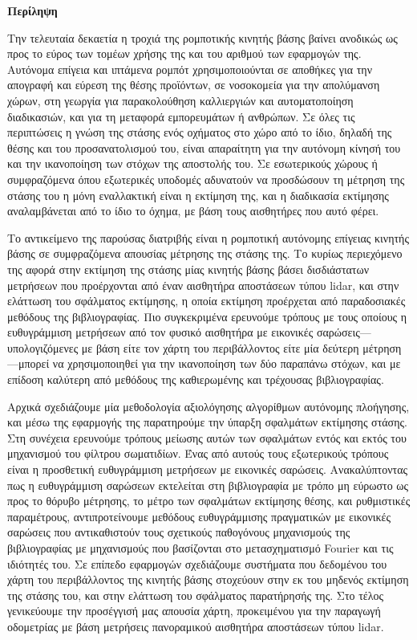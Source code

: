 \singlespace

\vfill
\begin{center}
\textbf{Περίληψη}
\end{center}
\noindent

Την τελευταία δεκαετία η τροχιά της ρομποτικής κινητής βάσης βαίνει ανοδικώς ως
προς το εύρος των τομέων χρήσης της και του αριθμού των εφαρμογών της. Αυτόνομα
επίγεια και ιπτάμενα ρομπότ χρησιμοποιούνται σε αποθήκες για την απογραφή και
εύρεση της θέσης προϊόντων, σε νοσοκομεία για την απολύμανση χώρων, στη γεωργία
για παρακολούθηση καλλιεργιών και αυτοματοποίηση διαδικασιών, και για τη
μεταφορά εμπορευμάτων ή ανθρώπων. Σε όλες τις περιπτώσεις η γνώση της στάσης
ενός οχήματος στο χώρο από το ίδιο, δηλαδή της θέσης και του προσανατολισμού
του, είναι απαραίτητη για την αυτόνομη κίνησή του και την ικανοποίηση των
στόχων της αποστολής του. Σε εσωτερικούς χώρους ή συμφραζόμενα όπου εξωτερικές
υποδομές αδυνατούν να προσδώσουν τη μέτρηση της στάσης του η μόνη εναλλακτική
είναι η εκτίμηση της, και η διαδικασία εκτίμησης αναλαμβάνεται από το ίδιο το
όχημα, με βάση τους αισθητήρες που αυτό φέρει.

Το αντικείμενο της παρούσας διατριβής είναι η ρομποτική αυτόνομης επίγειας
κινητής βάσης σε συμφραζόμενα απουσίας μέτρησης της στάσης της. Το κυρίως
περιεχόμενο της αφορά στην εκτίμηση της στάσης μίας κινητής βάσης βάσει
δισδιάστατων μετρήσεων που προέρχονται από έναν αισθητήρα αποστάσεων τύπου
lidar, και στην ελάττωση του σφάλματος εκτίμησης, η οποία εκτίμηση προέρχεται
από παραδοσιακές μεθόδους της βιβλιογραφίας. Πιο συγκεκριμένα ερευνούμε τρόπους
με τους οποίους η ευθυγράμμιση μετρήσεων από τον φυσικό αισθητήρα με εικονικές
σαρώσεις---υπολογιζόμενες με βάση είτε τον χάρτη του περιβάλλοντος είτε μία
δεύτερη μέτρηση---μπορεί να χρησιμοποιηθεί για την ικανοποίηση των δύο παραπάνω
στόχων, και με επίδοση καλύτερη από μεθόδους της καθιερωμένης και τρέχουσας
βιβλιογραφίας.

Αρχικά σχεδιάζουμε μία μεθοδολογία αξιολόγησης αλγορίθμων αυτόνομης πλοήγησης,
και μέσω της εφαρμογής της παρατηρούμε την ύπαρξη σφαλμάτων εκτίμησης στάσης.
Στη συνέχεια ερευνούμε τρόπους μείωσης αυτών των σφαλμάτων εντός και εκτός του
μηχανισμού του φίλτρου σωματιδίων. Ένας από αυτούς τους εξωτερικούς τρόπους
είναι η προσθετική ευθυγράμμιση μετρήσεων με εικονικές σαρώσεις.
Ανακαλύπτοντας πως η ευθυγράμμιση σαρώσεων εκτελείται στη βιβλιογραφία με τρόπο
μη εύρωστο ως προς το θόρυβο μέτρησης, το μέτρο των σφαλμάτων εκτίμησης θέσης,
και ρυθμιστικές παραμέτρους, αντιπροτείνουμε μεθόδους ευθυγράμμισης πραγματικών
με εικονικές σαρώσεις που αντικαθιστούν τους σχετικούς παθογόνους μηχανισμούς
της βιβλιογραφίας με μηχανισμούς που βασίζονται στο μετασχηματισμό Fourier και
τις ιδιότητές του. Σε επίπεδο εφαρμογών σχεδιάζουμε συστήματα που δεδομένου
του χάρτη του περιβάλλοντος της κινητής βάσης στοχεύουν στην εκ του μηδενός
εκτίμηση της στάσης του, και στην ελάττωση του σφάλματος παρατήρησής της. Στο
τέλος γενικεύουμε την προσέγγισή μας απουσία χάρτη, προκειμένου για την
παραγωγή οδομετρίας με βάση μετρήσεις πανοραμικού αισθητήρα αποστάσεων τύπου
lidar.


